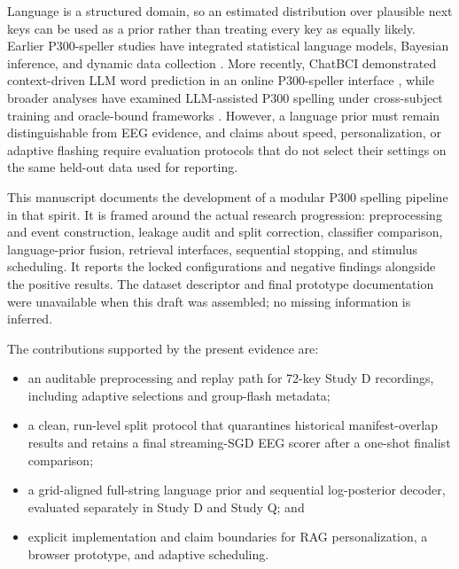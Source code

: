 \documentclass[final,5p,times,twocolumn,authoryear]{elsarticle}
\begin{document}
Language is a structured domain, so an estimated distribution over plausible next keys can be used as a prior rather than treating every key as equally likely. Earlier P300-speller studies have integrated statistical language models, Bayesian inference, and dynamic data collection \citep{speier2012,orhan2013context,delgado2015,mainsah2014lm,throckmorton2013bayesian}. More recently, ChatBCI demonstrated context-driven LLM word prediction in an online P300-speller interface \citep{hong2026chatbci}, while broader analyses have examined LLM-assisted P300 spelling under cross-subject training and oracle-bound frameworks \citep{parthasarathy2024evaluation,parthasarathy2026nearoptimal}. However, a language prior must remain distinguishable from EEG evidence, and claims about speed, personalization, or adaptive flashing require evaluation protocols that do not select their settings on the same held-out data used for reporting.

This manuscript documents the development of a modular P300 spelling pipeline in that spirit. It is framed around the actual research progression: preprocessing and event construction, leakage audit and split correction, classifier comparison, language-prior fusion, retrieval interfaces, sequential stopping, and stimulus scheduling. It reports the locked configurations and negative findings alongside the positive results. The dataset descriptor and final prototype documentation were unavailable when this draft was assembled; no missing information is inferred.

The contributions supported by the present evidence are:
\begin{itemize}
\item an auditable preprocessing and replay path for 72-key Study D recordings, including adaptive selections and group-flash metadata;
\item a clean, run-level split protocol that quarantines historical manifest-overlap results and retains a final streaming-SGD EEG scorer after a one-shot finalist comparison;
\item a grid-aligned full-string language prior and sequential log-posterior decoder, evaluated separately in Study D and Study Q; and
\item explicit implementation and claim boundaries for RAG personalization, a browser prototype, and adaptive scheduling.
\end{itemize}
\end{document}
